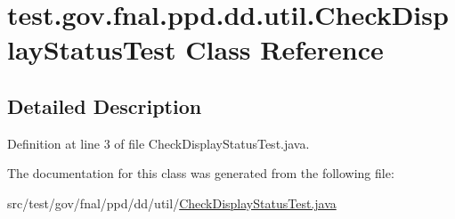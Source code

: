 \hypertarget{classtest_1_1gov_1_1fnal_1_1ppd_1_1dd_1_1util_1_1CheckDisplayStatusTest}{\section{test.\-gov.\-fnal.\-ppd.\-dd.\-util.\-Check\-Display\-Status\-Test Class Reference}
\label{classtest_1_1gov_1_1fnal_1_1ppd_1_1dd_1_1util_1_1CheckDisplayStatusTest}
}


\subsection{Detailed Description}


Definition at line 3 of file Check\-Display\-Status\-Test.\-java.



The documentation for this class was generated from the following file\-:\begin{DoxyCompactItemize}
\item 
src/test/gov/fnal/ppd/dd/util/\hyperlink{CheckDisplayStatusTest_8java}{Check\-Display\-Status\-Test.\-java}\end{DoxyCompactItemize}
